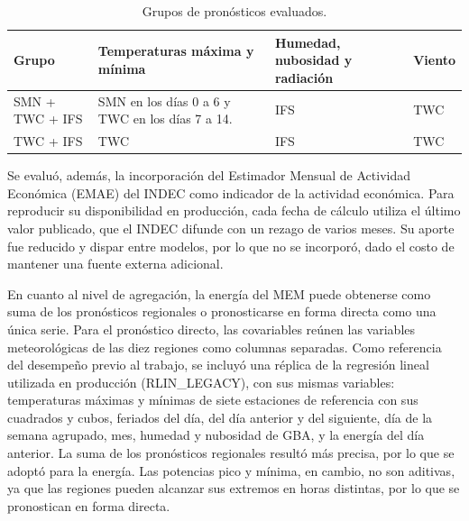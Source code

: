 \begin{table}[htbp]
	\centering
	\caption{Grupos de pronósticos evaluados.}
	\label{tab:grupos_pronosticos}
	\footnotesize
	\setlength{\tabcolsep}{4pt}
	\renewcommand{\arraystretch}{1.15}
	\begin{tabularx}{\textwidth}{
			@{}
			>{\raggedright\arraybackslash\hsize=0.8\hsize}X
			>{\raggedright\arraybackslash\hsize=1.4\hsize}X
			>{\raggedright\arraybackslash\hsize=1.1\hsize}X
			>{\raggedright\arraybackslash\hsize=0.7\hsize}X
			@{}
		}
		\toprule
		\textbf{Grupo} & \textbf{Temperaturas máxima y mínima} & \textbf{Humedad, nubosidad y radiación} & \textbf{Viento} \\
		\midrule
		SMN + TWC + IFS & SMN en los días 0 a 6 y TWC en los días 7 a 14. & IFS & TWC \\
		TWC + IFS & TWC & IFS & TWC \\
		\bottomrule
	\end{tabularx}
\end{table}

Se evaluó, además, la incorporación del Estimador Mensual de Actividad Económica (EMAE) del INDEC como indicador de la actividad económica. Para reproducir su disponibilidad en producción, cada fecha de cálculo utiliza el último valor publicado, que el INDEC difunde con un rezago de varios meses. Su aporte fue reducido y dispar entre modelos, por lo que no se incorporó, dado el costo de mantener una fuente externa adicional.

En cuanto al nivel de agregación, la energía del MEM puede obtenerse como suma de los pronósticos regionales o pronosticarse en forma directa como una única serie. Para el pronóstico directo, las covariables reúnen las variables meteorológicas de las diez regiones como columnas separadas. Como referencia del desempeño previo al trabajo, se incluyó una réplica de la regresión lineal utilizada en producción (RLIN\_LEGACY), con sus mismas variables: temperaturas máximas y mínimas de siete estaciones de referencia con sus cuadrados y cubos, feriados del día, del día anterior y del siguiente, día de la semana agrupado, mes, humedad y nubosidad de GBA, y la energía del día anterior. La suma de los pronósticos regionales resultó más precisa, por lo que se adoptó para la energía. Las potencias pico y mínima, en cambio, no son aditivas, ya que las regiones pueden alcanzar sus extremos en horas distintas, por lo que se pronostican en forma directa.

